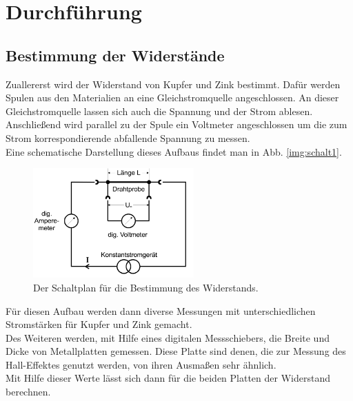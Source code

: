 \section{Durchführung}

\subsection{Bestimmung der Widerstände}
Zuallererst wird der Widerstand von Kupfer und Zink bestimmt. Dafür werden Spulen aus den Materialien an eine Gleichstromquelle angeschlossen.
An dieser Gleichstromquelle lassen sich auch die Spannung und der Strom ablesen.
Anschließend wird parallel zu der Spule ein Voltmeter angeschlossen um die zum Strom korrespondierende abfallende Spannung zu messen.\\
Eine schematische Darstellung dieses Aufbaus findet man in Abb. \ref{img:schalt1}.
\begin{figure}[H]
    \centering
    \includegraphics[width=0.55\textwidth]{images/widerstandmessung.PNG}
    \caption{Der Schaltplan für die Bestimmung des Widerstands\protect \cite{V311}.}
    \label{img:hall}
  \end{figure}
Für diesen Aufbau werden dann diverse Messungen mit unterschiedlichen Stromstärken für Kupfer und Zink gemacht.\\
Des Weiteren werden, mit Hilfe eines digitalen Messschiebers, die Breite und Dicke von Metallplatten gemessen. Diese Platte sind denen, die zur Messung des Hall-Effektes genutzt werden, 
von ihren Ausmaßen sehr ähnlich.\\
Mit Hilfe dieser Werte lässt sich dann für die beiden Platten der Widerstand berechnen.

